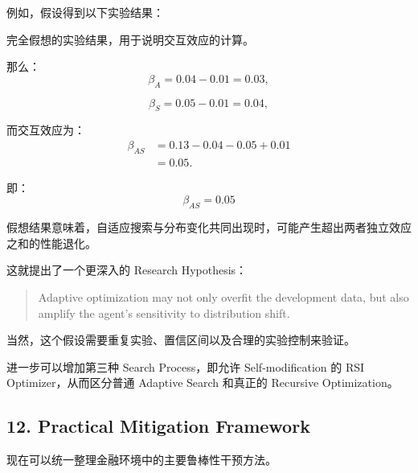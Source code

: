 例如，假设得到以下实验结果：


完全假想的实验结果，用于说明交互效应的计算。

那么：
\[\beta_A=0.04-0.01=0.03,\]

\[\beta_S=0.05-0.01=0.04,\]

而交互效应为：
\[\begin{aligned}
\beta_{AS}
&=0.13-0.04-0.05+0.01\\
&=0.05.
\end{aligned}\]

即：
\[\boxed{\beta_{AS}=0.05}\]

假想结果意味着，自适应搜索与分布变化共同出现时，可能产生超出两者独立效应之和的性能退化。

这就提出了一个更深入的 Research Hypothesis：

\begin{quote}
Adaptive optimization may not only overfit the development data, but also amplify the agent's sensitivity to distribution shift.
\end{quote}

当然，这个假设需要重复实验、置信区间以及合理的实验控制来验证。

进一步可以增加第三种 Search Process，即允许 Self-modification 的 RSI Optimizer，从而区分普通 Adaptive Search 和真正的 Recursive Optimization。

\hypertarget{part-4-77-0001-practical-mitigation-framework}{%
\subsection{12. Practical Mitigation Framework}\label{part-4-77-0001-practical-mitigation-framework}}

现在可以统一整理金融环境中的主要鲁棒性干预方法。

